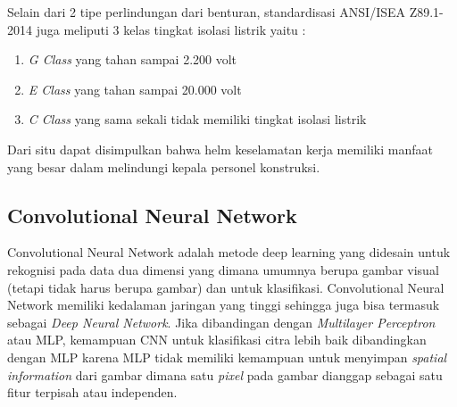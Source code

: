 Selain dari 2 tipe perlindungan dari benturan, standardisasi ANSI/ISEA Z89.1-2014 juga meliputi 3 kelas tingkat isolasi listrik yaitu \cite{american1997american}:
\begin{enumerate}
    \item \emph{G Class} yang tahan sampai 2.200 volt
    \item \emph{E Class} yang tahan sampai 20.000 volt
    \item \emph{C Class} yang sama sekali tidak memiliki tingkat isolasi listrik
\end{enumerate}

Dari situ dapat disimpulkan bahwa helm keselamatan kerja memiliki manfaat yang besar dalam melindungi kepala personel konstruksi.

\subsection{Convolutional Neural Network}
\label{subsec:convolutionalneuralnetwork}



Convolutional Neural Network adalah metode deep learning yang didesain untuk rekognisi pada data dua 
dimensi yang dimana umumnya berupa gambar visual (tetapi tidak harus berupa gambar) dan untuk klasifikasi.
Convolutional Neural Network memiliki kedalaman jaringan yang tinggi sehingga juga bisa termasuk sebagai \emph{Deep Neural Network}.
Jika dibandingan dengan \emph{Multilayer Perceptron} atau MLP, kemampuan CNN untuk klasifikasi citra lebih baik dibandingkan dengan MLP karena MLP tidak memiliki
kemampuan untuk menyimpan \emph{spatial information} dari gambar dimana satu \emph{pixel} pada gambar dianggap sebagai satu fitur
terpisah atau independen.

